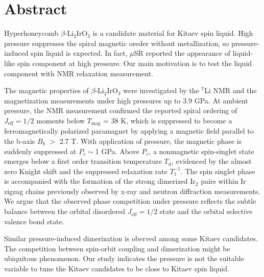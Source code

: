 \documentclass[a4,10.5pt]{report}
\begin{document}
\large
\tableofcontents

\chapter*{Abstract}
Hyperhoneycomb $\beta$-Li$_2$IrO$_3$ is a candidate material for Kitaev spin liquid.
High pressure suppresses the spiral magnetic oreder without metallization, so pressure-induced spin liquid is expected.
In fact, $\mu$SR reported the appearance of liquid-like spin component at high pressure.
Our main motivation is to test the liquid component with NMR relaxation measurement. 

The magnetic properties of $\beta$-Li$_2$IrO$_3$ were investigated 
by the ${}^7$Li NMR and the magnetization measurements under high pressures up to 3.9 GPa.  
At ambient pressure, the NMR measurement confirmed the reported spiral ordering of $J_{\mathrm{eff}} = 1/2$ moments below $T_{\mathrm{mag}}$ = 38 K, 
which is suppressed to become a ferromagnetically polarized paramagnet by applying a magnetic field parallel to the b-axis $B_b$ $>$ 2.7 T. 
With application of pressure, the magnetic phase is suddenly suppressed at $P_c \sim$1 GPa. 
Above $P_c$, a nonmagnetic spin-singlet state emerges below a first order transition temperature $T_\mathrm{d}$, 
evidenced by the almost zero Knight shift and the suppressed relaxation rate $T^{-1}_1$. 
The spin singlet phase is accompanied with the formation of the strong dimerized Ir$_2$ pairs within Ir zigzag chains previously observed by x-ray and neutron diffraction measurements. 
We argue that the observed phase competition under pressure reflects the subtle balance between the orbital disordered $J_{\mathrm{eff}} = 1/2$ state 
and the orbital selective valence bond state.

Similar pressure-induced dimerization is oberved among some Kitaev candidates.
The competition between spin-orbit coupling and dimerization might be ubiquitous phenomenon.
Our study indicates the pressure is not the suitable variable to tune the Kitaev candidates to be close to Kitaev spin liquid.
\end{document}
